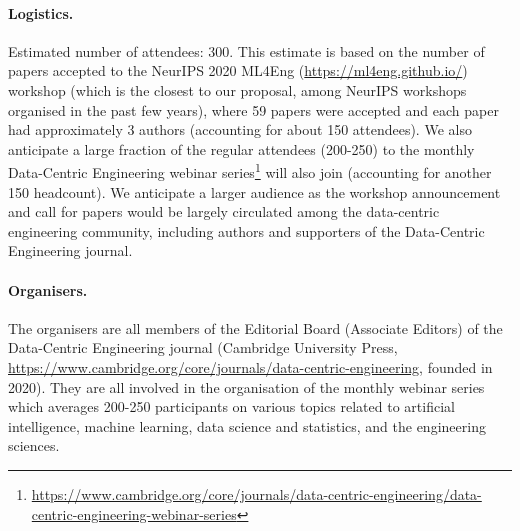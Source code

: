 \documentclass[11pt,a4paper]{scrartcl}
\theoremstyle{plain}  %
\begin{document}
\paragraph{Logistics.} Estimated number of attendees: 300. This estimate is based on the number of papers accepted to the NeurIPS 2020 ML4Eng (\url{https://ml4eng.github.io/}) workshop (which is the closest to our proposal, among NeurIPS workshops organised in the past few years), where 59 papers were accepted and each paper had approximately 3 authors (accounting for about 150 attendees). We also anticipate a large fraction of the regular attendees (200-250) to the monthly Data-Centric Engineering webinar series\footnote{\url{https://www.cambridge.org/core/journals/data-centric-engineering/data-centric-engineering-webinar-series}} will also join (accounting for another 150 headcount). We anticipate a larger audience as the workshop announcement and call for papers would be largely circulated among the data-centric engineering community, including authors and supporters of the Data-Centric Engineering journal.


\clearpage

\paragraph{Organisers.} The organisers are all members of the Editorial Board (Associate Editors) of the Data-Centric Engineering journal (Cambridge University Press, \url{https://www.cambridge.org/core/journals/data-centric-engineering}, founded in 2020). They are all involved in the organisation of the monthly webinar series which averages 200-250 participants on various topics related to artificial intelligence, machine learning, data science and statistics, and the engineering sciences.
\end{document}
